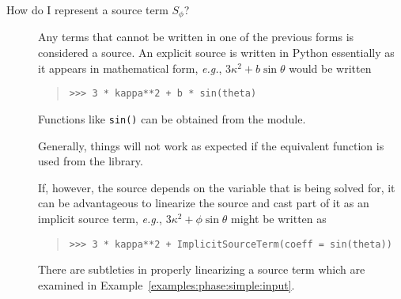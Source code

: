 \begin{description}
\begin{description}
            \item[How do I represent a source term $S_{\phi}$?]
            Any terms that cannot be written in one of the previous
            forms is considered a source.  An explicit source is
            written in Python essentially as it appears in
            mathematical form, \emph{e.g.}, $3\kappa^2 + b \sin
            \theta$ would be written
            \begin{quote}
\begin{verbatim}
>>> 3 * kappa**2 + b * sin(theta)
\end{verbatim}
            \end{quote}
            
            \begin{reSTadmonition}[Note]
                Functions like \verb+sin()+ can be obtained from the
                 module.
                \begin{reSTadmonition}[Warning]
                    Generally, things will not work as expected if the
                    equivalent function is used from the \Numeric{}
                    library.
                \end{reSTadmonition}
            \end{reSTadmonition}
            
            If, however, the source depends on the variable that is being solved for,
            it can be advantageous to linearize the source and cast part of it as an
            implicit source term, \emph{e.g.}, $3\kappa^2 + \phi \sin \theta$
            might be written as
            \begin{quote}
\begin{verbatim}
>>> 3 * kappa**2 + ImplicitSourceTerm(coeff = sin(theta))
\end{verbatim}
            \end{quote}
            
            \begin{reSTadmonition}[Warning]
                There are subtleties in properly linearizing a source term
                which are examined in
                Example~\ref{examples:phase:simple:input}.
            \end{reSTadmonition}


\end{description}
\end{description}

